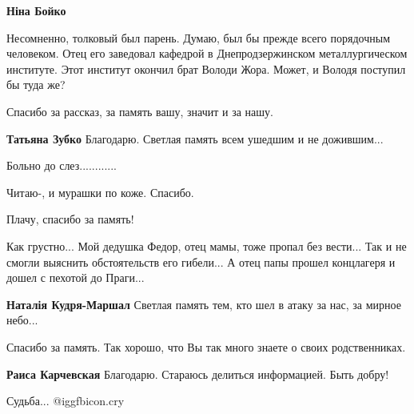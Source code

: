 \begin{itemize}
\begin{itemize}
\textbf{Ніна Бойко} 

Несомненно, толковый был парень. Думаю, был бы прежде всего порядочным
человеком. Отец его заведовал кафедрой в Днепродзержинском металлургическом
институте. Этот институт окончил брат Володи Жора. Может, и Володя поступил бы
туда же?

\end{itemize} %

Спасибо за рассказ, за память вашу, значит и за нашу.

\textbf{Татьяна Зубко} Благодарю. Светлая память всем ушедшим и не дожившим...

Больно до слез............

Читаю-, и мурашки по коже. Спасибо.

Плачу, спасибо за память!


Как грустно... Мой дедушка Федор, отец мамы, тоже пропал без вести... Так и не
смогли выяснить обстоятельств его гибели... А отец папы прошел концлагеря и
дошел с пехотой до Праги...

\textbf{Наталія Кудря-Маршал} Светлая память тем, кто шел в атаку за нас, за мирное небо...

Спасибо за память. Так хорошо, что Вы так много знаете о своих родственниках.

\textbf{Раиса Карчевская} Благодарю. Стараюсь делиться информацией. Быть добру!

Судьба... @igg{fbicon.cry} 

\end{itemize} %
